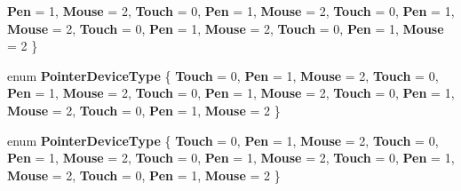 \begin{DoxyCompactItemize}
{\bfseries Pen} = 1, 
{\bfseries Mouse} = 2, 
{\bfseries Touch} = 0, 
\newline
{\bfseries Pen} = 1, 
{\bfseries Mouse} = 2, 
{\bfseries Touch} = 0, 
{\bfseries Pen} = 1, 
\newline
{\bfseries Mouse} = 2, 
{\bfseries Touch} = 0, 
{\bfseries Pen} = 1, 
{\bfseries Mouse} = 2, 
\newline
{\bfseries Touch} = 0, 
{\bfseries Pen} = 1, 
{\bfseries Mouse} = 2
 \}
\item 
\mbox{\label{namespace_windows_1_1_devices_1_1_input_a046eb61df09a21a64ff3d563cd3c46f6}} 
enum {\bfseries Pointer\+Device\+Type} \{ \newline
{\bfseries Touch} = 0, 
{\bfseries Pen} = 1, 
{\bfseries Mouse} = 2, 
{\bfseries Touch} = 0, 
\newline
{\bfseries Pen} = 1, 
{\bfseries Mouse} = 2, 
{\bfseries Touch} = 0, 
{\bfseries Pen} = 1, 
\newline
{\bfseries Mouse} = 2, 
{\bfseries Touch} = 0, 
{\bfseries Pen} = 1, 
{\bfseries Mouse} = 2, 
\newline
{\bfseries Touch} = 0, 
{\bfseries Pen} = 1, 
{\bfseries Mouse} = 2
 \}
\item 
\mbox{\label{namespace_windows_1_1_devices_1_1_input_a046eb61df09a21a64ff3d563cd3c46f6}} 
enum {\bfseries Pointer\+Device\+Type} \{ \newline
{\bfseries Touch} = 0, 
{\bfseries Pen} = 1, 
{\bfseries Mouse} = 2, 
{\bfseries Touch} = 0, 
\newline
{\bfseries Pen} = 1, 
{\bfseries Mouse} = 2, 
{\bfseries Touch} = 0, 
{\bfseries Pen} = 1, 
\newline
{\bfseries Mouse} = 2, 
{\bfseries Touch} = 0, 
{\bfseries Pen} = 1, 
{\bfseries Mouse} = 2, 
\newline
{\bfseries Touch} = 0, 
{\bfseries Pen} = 1, 
{\bfseries Mouse} = 2
 \}
\end{DoxyCompactItemize}

